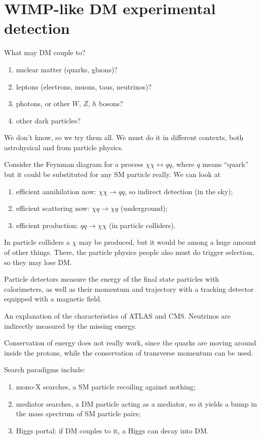 \documentclass[main.tex]{subfiles}
\begin{document}
\section{WIMP-like DM experimental detection}

What may DM couple to? 
\begin{enumerate}
    \item nuclear matter (quarks, gluons)?
    \item leptons (electrons, muons, taus, neutrinos)?
    \item photons, or other \(W\), \(Z\), \(h\) bosons?
    \item other dark particles?
\end{enumerate}

We don't know, so we try them all. 
We must do it in different contexts, both astrohysical and from particle physics. 

Consider the Feynman diagram for a process \(\chi \chi \leftrightarrow q q \), where \(q\) means ``quark'' but it could be substituted for any SM particle really. 
We can look at 
\begin{enumerate}
    \item efficient annihilation now: \(\chi \chi \to q q\), so indirect detection (in the sky);
    \item efficient scattering now: \(\chi q \to \chi q\) (underground);
    \item efficient production: \(q q \to \chi \chi \) (in particle colliders).
\end{enumerate}

In particle colliders a \(\chi \) may be produced, but it would be among a huge amount of other things. 
There, the particle physics people also must do trigger selection, so they may lose DM. 

Particle detectors measure the energy of the final state particles with calorimeters, as well as their momentum and trajectory with a tracking detector equipped with a magnetic field. 

An explanation of the characteristics of ATLAS and CMS.
Neutrinos are indirectly measured by the missing energy. 


Conservation of energy does not really work, since the quarks are moving around inside the protons, while the conservation of transverse momentum can be used. 

Search paradigms include: 
\begin{enumerate}
    \item mono-X searches, a SM particle recoiling against nothing;
    \item mediator searches, a DM particle acting as a mediator, so it yields a bump in the mass spectrum of SM particle pairs;
    \item Higgs portal: if DM couples to it, a Higgs can decay into DM. 
\end{enumerate}
\end{document}
